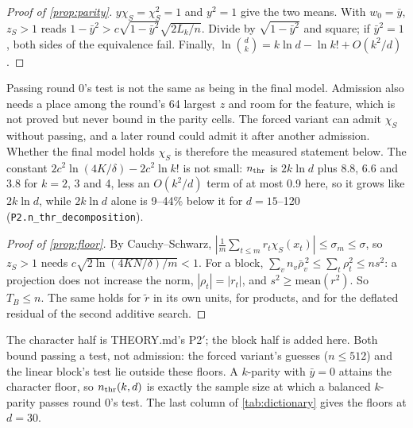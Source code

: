 \begin{proof}[Proof of \cref{prop:parity}]
$y\chi_S=\chi_S^2=1$ and $y^2=1$ give the two means. With $w_0=\bar y$, $z_S>1$ reads $1-\bar y^2>c\sqrt{1-\bar y^2}\sqrt{2L_k/n}$. Divide by $\sqrt{1-\bar y^2}$ and square; if $\bar y^2=1$, both sides of the equivalence fail. Finally, $\ln\binom dk=k\ln d-\ln k!+O(k^2/d)$.
\end{proof}
Passing round 0's test is not the same as being in the final model. Admission also needs a place among the round's 64 largest $z$ and room for the feature, which is not proved but never bound in the parity cells. The forced variant can admit $\chi_S$ without passing, and a later round could admit it after another admission. Whether the final model holds $\chi_S$ is therefore the measured statement below. The constant $2c^2\ln(4K/\delta)-2c^2\ln k!$ is not small: $n_{\rm thr}$ is $2k\ln d$ plus 8.8, 6.6 and 3.8 for $k=2$, 3 and 4, less an $O(k^2/d)$ term of at most 0.9 here, so it grows like $2k\ln d$, while $2k\ln d$ alone is 9--44\% below it for $d=15$--120 (\texttt{P2.n\_thr\_decomposition}).

\begin{proof}[Proof of \cref{prop:floor}]
By Cauchy--Schwarz, $|\frac1m\sum_{t\le m}r_t\chi_S(x_t)|\le\sigma_m\le\sigma$, so $z_S>1$ needs $c\sqrt{2\ln(4KN/\delta)/m}<1$. For a block, $\sum_vn_v\bar\rho_v^{\,2}\le\sum_t\rho_t^2\le ns^2$: a projection does not increase the norm, $|\rho_t|=|r_t|$, and $s^2\ge\mathrm{mean}(r^2)$. So $T_B\le n$. The same holds for $\tilde r$ in its own units, for products, and for the deflated residual of the second additive search.
\end{proof}
The character half is THEORY.md's P2$'$; the block half is added here. Both bound passing a test, not admission: the forced variant's guesses ($n\le512$) and the linear block's test lie outside these floors. A $k$-parity with $\bar y=0$ attains the character floor, so $n_{\rm thr}(k,d)$ is exactly the sample size at which a balanced $k$-parity passes round 0's test. The last column of \cref{tab:dictionary} gives the floors at $d=30$.

